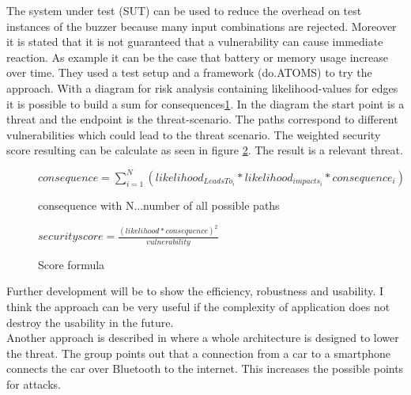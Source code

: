 \documentclass[12pt,a4paper]{article}
\begin{document}
The system under test (SUT) can be used to reduce the overhead on test instances of the buzzer because many input combinations are rejected. Moreover it is stated that it is not guaranteed that a vulnerability can cause immediate reaction. As example it can be the case that battery or memory usage increase over time. They used a test setup and a framework (do.ATOMS) to try the approach. With a diagram for risk analysis containing likelihood-values for edges it is possible to build a sum for consequences\ref{consequences_formula}. In the diagram the start point is a threat and the endpoint is the threat-scenario. The paths correspond to different vulnerabilities which could lead to the threat scenario. 
The weighted security score resulting can be calculate as seen in figure \ref{security_formula}. The result is a relevant threat.

\begin{figure}[h]
\begin{center}
	\begin{math}
	consequence = \sum_{i=1}^{N} (likelihood_{LeadsTo_i} * likelihood_{impacts_i} * consequence_i)
	\end{math}
	\caption{consequence with N...number of all possible paths \cite{DBLP:conf/automotiveSS/JakobKSGMSF12} }
\label{consequences_formula}
\end{center}
\end{figure}

\begin{figure}[h]
\begin{center}
\begin{math}
	security score = \frac{(likelihood * consequence)^2}{vulnerability}
\end{math}
\caption{Score formula \cite{DBLP:conf/automotiveSS/JakobKSGMSF12}}
\label{security_formula}
\end{center}
\end{figure}
Further development will be to show the efficiency, robustness and usability.
I think the approach can be very useful if the complexity of application does not destroy the usability in the future.\\

Another approach is described in \cite{DBLP:journals/esl/DardanelliMTZSKH13} where a whole architecture is designed to lower the threat. The group points out that a connection from a car to a smartphone connects the car over Bluetooth to the internet. This increases the possible points for attacks.\\
\end{document}
